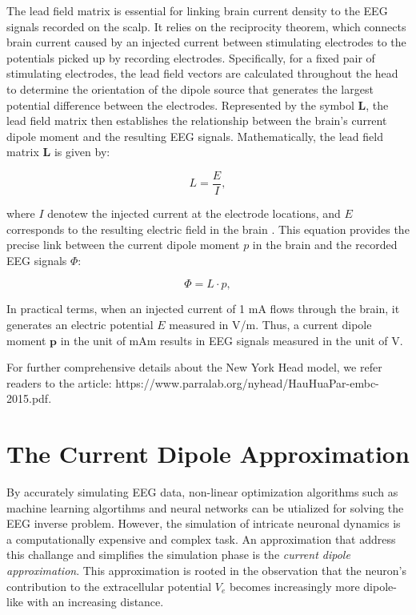 \documentclass[a4paper, UKenglish, 11pt]{uiomaster}
\begin{document}
The lead field matrix is essential for linking brain current density to the EEG signals recorded on the scalp. It relies on the reciprocity theorem, which connects brain current caused by an injected current between stimulating electrodes to the potentials picked up by recording electrodes. Specifically, for a fixed pair of stimulating electrodes, the lead field vectors are calculated throughout the head to determine the orientation of the dipole source that generates the largest potential difference between the electrodes. Represented by the symbol $\boldsymbol{L}$, the lead field matrix then establishes the relationship between the brain's current dipole moment and the resulting EEG signals. Mathematically, the lead field matrix $\boldsymbol{L}$ is given by:

\begin{equation}
L = \frac{E}{I},
\label{eq:R2}
\end{equation}

where $I$ denotew the injected current at the electrode locations, and $E$ corresponds to the resulting electric field in the brain \cite{naess2021biophysically}. This equation provides the precise link between the current dipole moment $p$ in the brain and the recorded EEG signals $\Phi$:

\begin{equation}
\Phi = L \cdot p,
\label{eq:EEG_signal}
\end{equation}

In practical terms, when an injected current of 1 mA flows through the brain, it generates an electric potential $E$ measured in V/m. Thus, a current dipole moment $\textbf{p}$ in the unit of mAm results in EEG signals measured in the unit of V.

For further comprehensive details about the New York Head model, we refer readers to the article: https://www.parralab.org/nyhead/HauHuaPar-embc-2015.pdf.


\section{The Current Dipole Approximation}
By accurately simulating EEG data, non-linear optimization algorithms such as machine learning algortihms and neural networks can be utialized for solving the EEG inverse problem. However, the simulation of intricate neuronal dynamics is a computationally expensive and complex task. An approximation that address this challange and simplifies the simulation phase is the \emph{current dipole approximation}. This approximation is rooted in the observation that the neuron's contribution to the extracellular potential $V_e$ becomes increasingly more dipole-like with an increasing distance.
\end{document}

